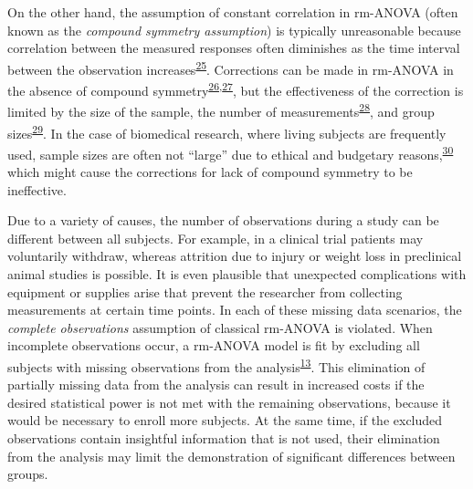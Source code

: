 \documentclass[
]{article}
\begin{document}
On the other hand, the assumption of constant correlation in rm-ANOVA (often known as the \emph{compound symmetry assumption}) is typically unreasonable because correlation between the measured responses often diminishes as the time interval between the observation increases\textsuperscript{\protect\hyperlink{ref-ugrinowitsch2004}{25}}. Corrections can be made in rm-ANOVA in the absence of compound symmetry\textsuperscript{\protect\hyperlink{ref-huynh1976}{26},\protect\hyperlink{ref-greenhouse1959}{27}}, but the effectiveness of the correction is limited by the size of the sample, the number of measurements\textsuperscript{\protect\hyperlink{ref-haverkamp2017}{28}}, and group sizes\textsuperscript{\protect\hyperlink{ref-keselman2001}{29}}. In the case of biomedical research, where living subjects are frequently used, sample sizes are often not ``large'' due to ethical and budgetary reasons,\textsuperscript{\protect\hyperlink{ref-charan2013}{30}} which might cause the corrections for lack of compound symmetry to be ineffective.

Due to a variety of causes, the number of observations during a study can be different between all subjects. For example, in a clinical trial patients may voluntarily withdraw, whereas attrition due to injury or weight loss in preclinical animal studies is possible. It is even plausible that unexpected complications with equipment or supplies arise that prevent the researcher from collecting measurements at certain time points. In each of these missing data scenarios, the \emph{complete observations} assumption of classical rm-ANOVA is violated. When incomplete observations occur, a rm-ANOVA model is fit by excluding all subjects with missing observations from the analysis\textsuperscript{\protect\hyperlink{ref-gueorguieva2004}{13}}. This elimination of partially missing data from the analysis can result in increased costs if the desired statistical power is not met with the remaining observations, because it would be necessary to enroll more subjects. At the same time, if the excluded observations contain insightful information that is not used, their elimination from the analysis may limit the demonstration of significant differences between groups.
\end{document}
